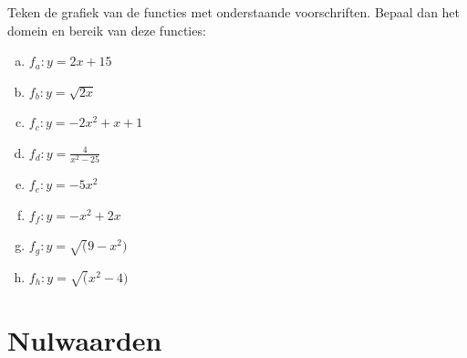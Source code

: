 \documentclass[12pt,twoside]{article}
\begin{document}
\begin{oefening}
  Teken de grafiek van de functies met onderstaande voorschriften. Bepaal dan het domein en bereik van deze functies:
  \begin{enumerate}[(a)]
    \itemsep0.8em
  \item $\displaystyle f_a : y=2x+15$
  \item $\displaystyle f_b : y=\sqrt{2x}$
  \item $\displaystyle f_c : y=-2x^2+x+1$
  \item $\displaystyle f_d : y=\frac{4}{x^2-25}$
  \item $\displaystyle f_e : y=-5x^2$
  \item $\displaystyle f_f : y=-x^2+2x$
  \item $\displaystyle f_g : y=\sqrt(9-x^2)$
  \item $\displaystyle f_h : y=\sqrt(x^2-4)$
  \end{enumerate}
\end{oefening}

\pagebreak
\section{Nulwaarden}
\end{document}
